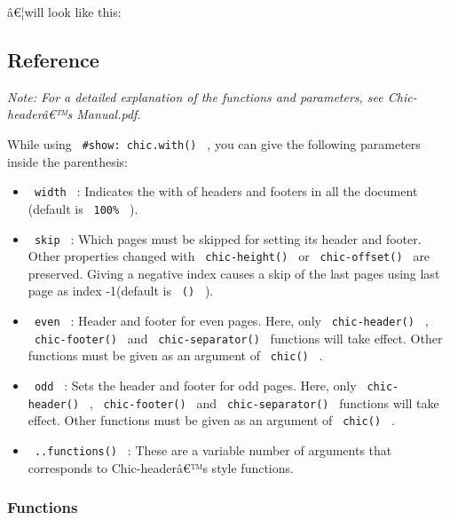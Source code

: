 â€¦will look like this:

\subsubsection{\texorpdfstring{\protect{}}{Usage example}}\label{usage-example}

\subsection{Reference}\label{reference}

\emph{Note: For a detailed explanation of the functions and parameters,
see Chic-headerâ€™s Manual.pdf.}

While using \texttt{\ \#show:\ chic.with()\ } , you can give the
following parameters inside the parenthesis:

\begin{itemize}
\tightlist
\item
  \texttt{\ width\ } : Indicates the with of headers and footers in all
  the document (default is \texttt{\ 100\%\ } ).
\item
  \texttt{\ skip\ } : Which pages must be skipped for setting its header
  and footer. Other properties changed with \texttt{\ chic-height()\ }
  or \texttt{\ chic-offset()\ } are preserved. Giving a negative index
  causes a skip of the last pages using last page as index -1(default is
  \texttt{\ ()\ } ).
\item
  \texttt{\ even\ } : Header and footer for even pages. Here, only
  \texttt{\ chic-header()\ } , \texttt{\ chic-footer()\ } and
  \texttt{\ chic-separator()\ } functions will take effect. Other
  functions must be given as an argument of \texttt{\ chic()\ } .
\item
  \texttt{\ odd\ } : Sets the header and footer for odd pages. Here,
  only \texttt{\ chic-header()\ } , \texttt{\ chic-footer()\ } and
  \texttt{\ chic-separator()\ } functions will take effect. Other
  functions must be given as an argument of \texttt{\ chic()\ } .
\item
  \texttt{\ ..functions()\ } : These are a variable number of arguments
  that corresponds to Chic-headerâ€™s style functions.
\end{itemize}

\subsubsection{Functions}\label{functions}

